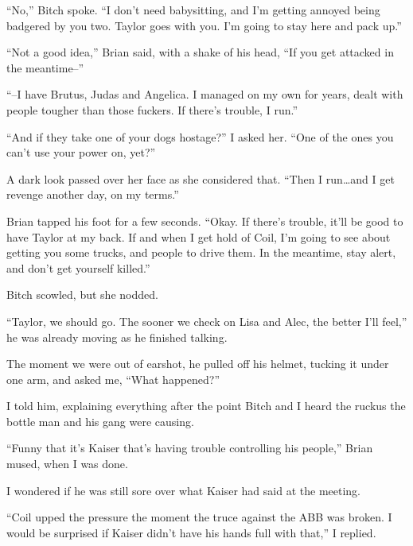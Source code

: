 ``No,'' Bitch spoke.  ``I don't need babysitting, and I'm getting annoyed being badgered by you two.  Taylor goes with you.  I'm going to stay here and pack up.''



``Not a good idea,'' Brian said, with a shake of his head, ``If you get attacked in the meantime--''



``--I have Brutus, Judas and Angelica.  I managed on my own for years, dealt with people tougher than those fuckers.  If there's trouble, I run.''



``And if they take one of your dogs hostage?'' I asked her.  ``One of the ones you can't use your power on, yet?''



A dark look passed over her face as she considered that.  ``Then I run\ldots and I get revenge another day, on my terms.''



Brian tapped his foot for a few seconds.  ``Okay.  If there's trouble, it'll be good to have Taylor at my back.  If and when I get hold of Coil, I'm going to see about getting you some trucks, and people to drive them.  In the meantime, stay alert, and don't get yourself killed.''



Bitch scowled, but she nodded.



``Taylor, we should go.  The sooner we check on Lisa and Alec, the better I'll feel,'' he was already moving as he finished talking.



The moment we were out of earshot, he pulled off his helmet, tucking it under one arm, and asked me, ``What happened?''



I told him, explaining everything after the point Bitch and I heard the ruckus the bottle man and his gang were causing.



``Funny that it's Kaiser that's having trouble controlling his people,'' Brian mused, when I was done.



I wondered if he was still sore over what Kaiser had said at the meeting.



``Coil upped the pressure the moment the truce against the ABB was broken.  I would be surprised if Kaiser didn't have his hands full with that,'' I replied.



